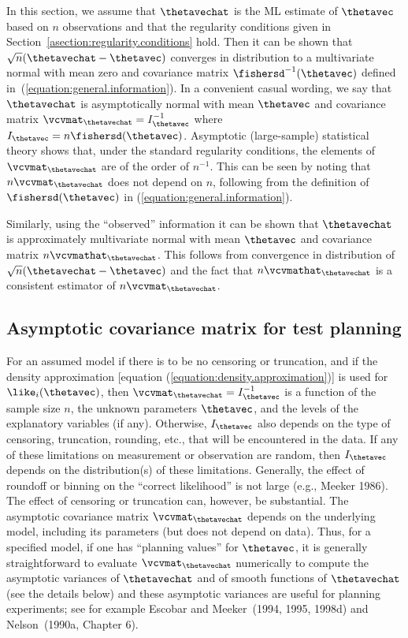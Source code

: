 In this section, we assume that $\thetavechat$ is the
ML estimate of $\thetavec$ based on $n$ observations
and that the 
regularity conditions given in 
Section~\ref{asection:regularity.conditions}
hold. Then it can be shown that 
$\sqrt{n}(\thetavechat-\thetavec)$ converges 
in distribution
to a  multivariate
normal with mean zero and covariance matrix $\fishersd^{-1}(\thetavec)$
defined in~(\ref{equation:general.information}).
In a convenient casual wording, we say that $\thetavechat$
is asymptotically normal with mean $\thetavec$ and
covariance matrix 
$
\vcvmat_{\thetavechat}=I_{\thetavec} ^{-1}
$
where $I_{\thetavec}= n \fishersd(\thetavec)$.
Asymptotic
(large-sample) statistical theory shows that, under the standard
regularity conditions, the elements of $\vcvmat_{\thetavechat}$ are of
the order of $n^{-1}$. This can be seen by noting that
$n\vcvmat_{\thetavechat}$ does not depend on $n$, following from the
definition of $\fishersd(\thetavec)$ in (\ref{equation:general.information}).

Similarly, using the ``observed'' information
it can be shown that $\thetavechat$
is approximately multivariate
normal with mean $\thetavec$ 
 and covariance matrix 
$n \vcvmathat_{\thetavechat}$. This follows from 
convergence in distribution of 
$\sqrt{n}(\thetavechat-\thetavec)$ and the
fact that $n \vcvmathat_{\thetavechat}$ is a 
consistent estimator of $n \vcvmat_{\thetavechat}$.


\subsection{Asymptotic covariance matrix for test planning}
\label{asection:asymptotic.covariance}
For an assumed model if there is to be no censoring or truncation,
and if the density approximation
[equation (\ref{equation:density.approximation})] is used for
$\like_{i}(\thetavec)$, then
$\vcvmat_{\thetavechat}=I_{\thetavec}^{-1}$ is a function of the
sample size $n$, the unknown parameters $\thetavec$, and the levels
of the explanatory variables (if any). Otherwise, $I_{\thetavec}$
also depends on the type of censoring, truncation, rounding, etc.,
that will be encountered in the data.  If any of these limitations
on measurement or observation are random, then $I_{\thetavec}$
depends on the distribution(s) of these limitations.  Generally, the
effect of roundoff or binning on the ``correct likelihood'' is not
large (e.g., Meeker 1986). The effect of censoring or truncation
can, however, be substantial. The asymptotic covariance matrix
$\vcvmat_{\thetavechat}$ depends on the underlying model, including
its parameters (but does not depend on data). Thus, for a specified
model, if one has ``planning values'' for $\thetavec$, it is
generally straightforward to evaluate $\vcvmat_{\thetavechat}$
numerically to compute the asymptotic variances of $\thetavechat$
and of smooth functions of $\thetavechat$ (see the details below)
and these asymptotic variances are useful for planning experiments;
see for example Escobar and Meeker~(1994, 1995, 1998d) and
Nelson~(1990a, Chapter 6).

